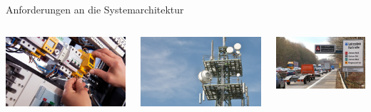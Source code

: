 {\begin{frame}{Anforderungen an die Systemarchitektur}
    \bigskip

    \begin{columns}[onlytextwidth]
        \includegraphics[width=\textwidth]{img/anforderungen1}

        \includegraphics[width=\textwidth]{img/anforderungen2}

        \includegraphics[width=\textwidth]{img/anforderungen3}
    \end{columns}


\end{frame}}
